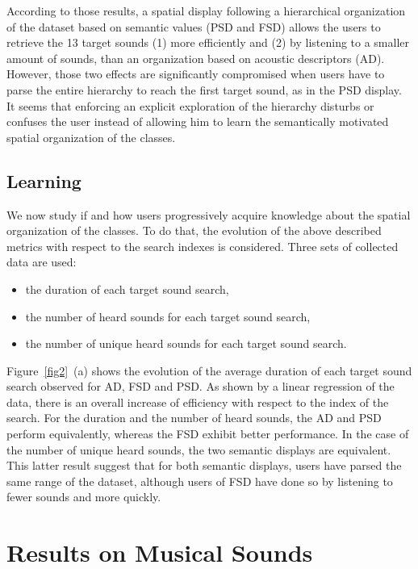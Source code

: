 \documentclass{aes2e}
\begin{document}
According to those results, a spatial display following a hierarchical organization of the dataset based on semantic values (PSD and FSD) allows the users to retrieve the 13 target sounds (1) more efficiently and (2) by listening to a smaller amount of sounds, than an organization based on acoustic descriptors (AD). However, those two effects are significantly compromised when users have to parse the entire hierarchy to reach the first target sound, as in the PSD display. It seems that enforcing an explicit exploration of the hierarchy disturbs or confuses the user instead of allowing him to learn the semantically motivated spatial organization of the classes. 


\subsection{Learning}

We now study if and how users progressively acquire knowledge about the spatial organization of the classes. To do that, the evolution of the above described metrics with respect to the search indexes is considered. Three sets of collected data are used:

\begin{itemize}
\item the duration of each target sound search,
\item the number of heard sounds for each target sound search,
\item the number of unique heard sounds for each target sound search. 
\end{itemize}

Figure~\ref{fig2}~(a) shows the evolution of the average duration of each target sound search observed for AD, FSD and PSD. As shown by a linear regression of the data, there is an overall increase of efficiency with respect to the index of the search. For the duration and the number of heard sounds, the AD and PSD perform equivalently, whereas the FSD exhibit better performance. In the case of the number of unique heard sounds, the two semantic displays are equivalent. This latter result suggest that for both semantic displays, users have parsed the same range of the dataset, although users of FSD have done so by listening to fewer sounds and more quickly. 

\section{Results on Musical Sounds}
\end{document}
